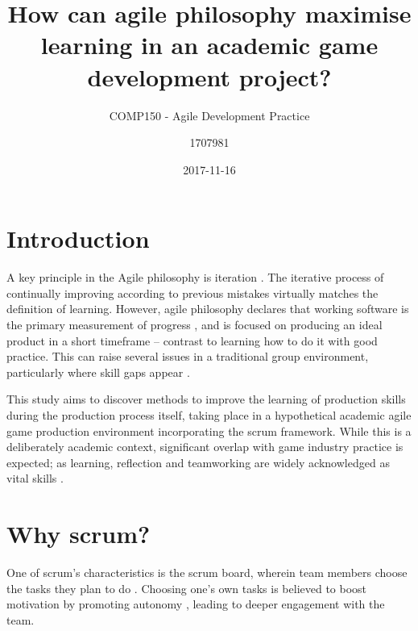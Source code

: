 \documentclass{scrartcl}
\title{How can agile philosophy maximise learning in an academic game development project?}
\subtitle{COMP150 - Agile Development Practice}
\date{2017-11-16}
\author{1707981}
\begin{document}
\maketitle
{}



\section{Introduction}
A key principle in the Agile philosophy is iteration \cite{agile}. The iterative process of continually improving according to previous mistakes virtually matches the definition of learning. However, agile philosophy declares that working software is the primary measurement of progress \cite{manifesto}, and is focused on producing an ideal product in a short timeframe -- contrast to learning how to do it with good practice. This can raise several issues in a traditional group environment, particularly where skill gaps appear \cite{group2003}.

This study aims to discover methods to improve the learning of production skills during the production process itself, taking place in a hypothetical academic agile game production environment incorporating the scrum framework. While this is a deliberately academic context, significant overlap with game industry practice is expected; as learning, reflection and teamworking are widely acknowledged as vital skills \cite{collaboration, devstudy}.


\section{Why scrum?}
One of scrum's characteristics is the scrum board, wherein team members choose the tasks they plan to do \cite{scrum}. Choosing one's own tasks is believed to boost motivation by promoting autonomy \cite{motivation}, leading to deeper engagement with the team.
\end{document}
